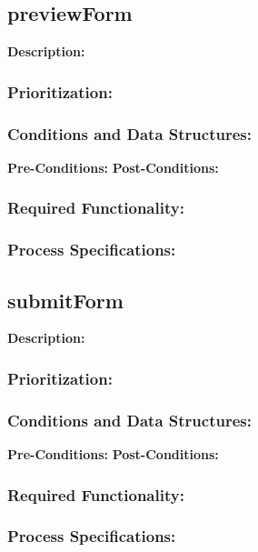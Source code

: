 \subsection{previewForm}
\textbf{Description:}
\subsubsection{Prioritization:}
\subsubsection{Conditions and Data Structures:}
\textbf{Pre-Conditions:}
\textbf{Post-Conditions:}	
\subsubsection{Required Functionality:} 
\subsubsection{Process Specifications:}


\subsection{submitForm}
\textbf{Description:}
\subsubsection{Prioritization:}
\subsubsection{Conditions and Data Structures:}
\textbf{Pre-Conditions:}
\textbf{Post-Conditions:}	
\subsubsection{Required Functionality:} 
\subsubsection{Process Specifications:}